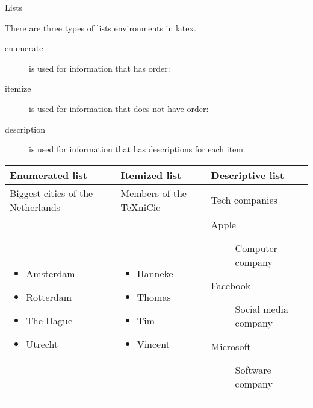 \begin{frame}[fragile]{Lists}

There are three types of lists environments in latex.


\begin{description}
	\item[enumerate]  is used for information that has order:
	\item[itemize] is used for information that does not have order:
	\item[description] is used for information that has descriptions for each item
\end{description}
	\begin{tcolorbox}[width=13cm, title={Examples}, size=small]
	\begin{tabular}{m{3cm}| m{3cm} | m{5cm}}
		\textbf{Enumerated list} & \textbf{Itemized list} & \textbf{Descriptive list}\\
		\hline
		Biggest cities of the Netherlands &Members of the TeXniCie &   Tech companies\\
		\hline
		\begin{itemize}[label=\textbullet]
			\item Amsterdam 
			\item Rotterdam
			\item The Hague
			\item Utrecht
		\end{itemize}
		&
		\begin{itemize}[label=\textbullet]
			\item Hanneke 
			\item Thomas
			\item Tim
			\item Vincent
		\end{itemize}
		& 
		\begin{description}
			\item[Apple] Computer company
			\item[Facebook] Social media company
			\item[Microsoft] Software company
		\end{description}
	\end{tabular}
	\end{tcolorbox}
\end{frame}
